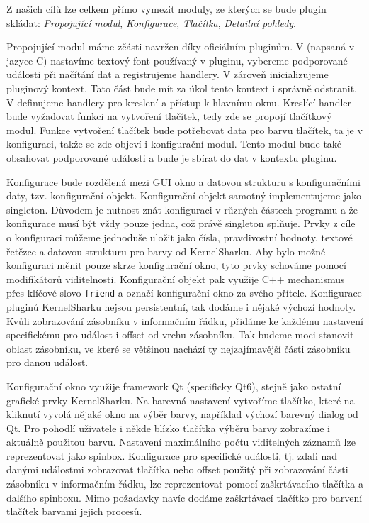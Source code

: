Z našich cílů lze celkem přímo vymezit moduly, ze kterých se bude plugin skládat: \emph{Propojující modul}, \emph{Konfigurace}, \emph{Tlačítka}, \emph{Detailní pohledy}.

Propojující modul máme zčásti navržen díky oficiálním pluginům. V  (napsaná v jazyce C) nastavíme textový font používaný v pluginu, vybereme podporované události při načítání dat a registrujeme handlery. V  zároveň inicializujeme pluginový kontext. Tato část bude mít za úkol tento kontext i správně odstranit. V  definujeme handlery pro kreslení a přístup k hlavnímu oknu. Kreslící handler bude vyžadovat funkci na vytvoření tlačítek, tedy zde se propojí tlačítkový modul. Funkce vytvoření tlačítek bude potřebovat data pro barvu tlačítek, ta je v konfiguraci, takže se zde objeví i konfigurační modul. Tento modul bude také obsahovat podporované události a bude je sbírat do dat v kontextu pluginu.

Konfigurace bude rozdělená mezi GUI okno a datovou strukturu s konfiguračními daty, tzv. konfigurační objekt. Konfigurační objekt samotný implementujeme jako singleton. Důvodem je nutnost znát konfiguraci v různých částech programu a že konfigurace musí být vždy pouze jedna, což právě singleton splňuje. Prvky z cíle o konfiguraci můžeme jednoduše uložit jako čísla, pravdivostní hodnoty, textové řetězce a datovou strukturu pro barvy od KernelSharku. Aby bylo možné konfiguraci měnit pouze skrze konfigurační okno, tyto prvky schováme pomocí modifikátorů viditelnosti. Konfigurační objekt pak využije C++ mechanismus  přes klíčové slovo \texttt{friend} a označí konfigurační okno za svého přítele. Konfigurace pluginů KernelSharku nejsou persistentní, tak dodáme i nějaké výchozí hodnoty. Kvůli zobrazování zásobníku v informačním řádku, přidáme ke každému nastavení specifickému pro událost i offset od vrchu zásobníku. Tak budeme moci stanovit oblast zásobníku, ve které se většinou nachází ty nejzajímavější části zásobníku pro danou událost.

Konfigurační okno využije framework Qt (specificky Qt6), stejně jako ostatní grafické prvky KernelSharku. Na barevná nastavení vytvoříme tlačítko, které na kliknutí vyvolá nějaké okno na výběr barvy, například výchozí barevný dialog od Qt. Pro pohodlí uživatele i někde blízko tlačítka výběru barvy zobrazíme i aktuálně použitou barvu. Nastavení maximálního počtu viditelných záznamů lze reprezentovat jako spinbox. Konfigurace pro specifické události, tj. zdali nad danými událostmi zobrazovat tlačítka nebo offset použitý při zobrazování části zásobníku v informačním řádku, lze reprezentovat pomocí zaškrtávacího tlačítka a dalšího spinboxu. Mimo požadavky navíc dodáme zaškrtávací tlačítko pro barvení tlačítek barvami jejich procesů.

